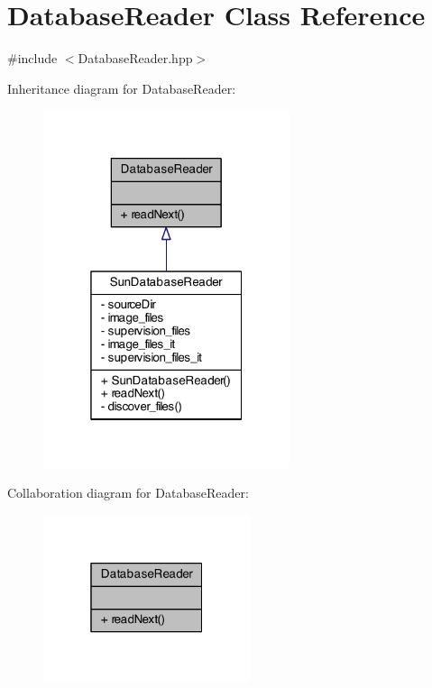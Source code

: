 \hypertarget{class_database_reader}{\section{Database\+Reader Class Reference}
\label{class_database_reader}
}


{\ttfamily \#include $<$Database\+Reader.\+hpp$>$}



Inheritance diagram for Database\+Reader\+:\nopagebreak
\begin{figure}[H]
\begin{center}
\leavevmode
\includegraphics[width=205pt]{class_database_reader__inherit__graph}
\end{center}
\end{figure}


Collaboration diagram for Database\+Reader\+:\nopagebreak
\begin{figure}[H]
\begin{center}
\leavevmode
\includegraphics[width=172pt]{class_database_reader__coll__graph}
\end{center}
\end{figure}
